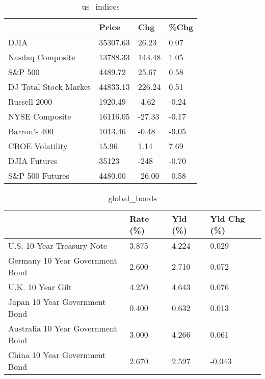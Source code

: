 \documentclass{article}%
\begin{document}
%


\begin{table}[htbp]%
\caption{us\_indices}%
\centering%
\begin{adjustbox}{width=1\textwidth}%
\begin{tabular}{llll}
\toprule
                      &    Price &    Chg &  \%Chg \\
\midrule
                 DJIA & 35307.63 &  26.23 &  0.07 \\
     Nasdaq Composite & 13788.33 & 143.48 &  1.05 \\
              S\&P 500 &  4489.72 &  25.67 &  0.58 \\
DJ Total Stock Market & 44833.13 & 226.24 &  0.51 \\
         Russell 2000 &  1920.49 &  -4.62 & -0.24 \\
       NYSE Composite & 16116.05 & -27.33 & -0.17 \\
         Barron's 400 &  1013.46 &  -0.48 & -0.05 \\
      CBOE Volatility &    15.96 &   1.14 &  7.69 \\
         DJIA Futures &    35123 &   -248 & -0.70 \\
      S\&P 500 Futures &  4480.00 & -26.00 & -0.58 \\
\bottomrule
\end{tabular}
%
\end{adjustbox}%
\end{table}

%


\begin{table}[htbp]%
\caption{global\_bonds}%
\centering%
\begin{adjustbox}{width=1\textwidth}%
\begin{tabular}{llll}
\toprule
                                  & Rate (\%) & Yld (\%) & Yld Chg (\%) \\
\midrule
       U.S. 10 Year Treasury Note &    3.875 &   4.224 &       0.029 \\
  Germany 10 Year Government Bond &    2.600 &   2.710 &       0.072 \\
                U.K. 10 Year Gilt &    4.250 &   4.643 &       0.076 \\
    Japan 10 Year Government Bond &    0.400 &   0.632 &       0.013 \\
Australia 10 Year Government Bond &    3.000 &   4.266 &       0.061 \\
    China 10 Year Government Bond &    2.670 &   2.597 &      -0.043 \\
\bottomrule
\end{tabular}
%
\end{adjustbox}%
\end{table}
\end{document}
